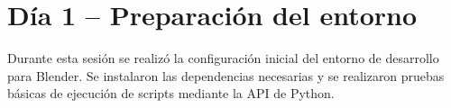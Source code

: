 \section{Día 1 – Preparación del entorno}

Durante esta sesión se realizó la configuración inicial del entorno de desarrollo
para Blender. Se instalaron las dependencias necesarias y se realizaron pruebas
básicas de ejecución de scripts mediante la API de Python.